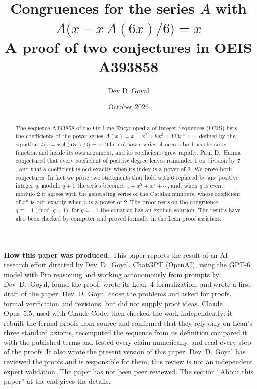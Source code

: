 \documentclass[11pt,a4paper]{article}
\title{Congruences for the series $A$ with $A\bigl(x-x\,A(6x)/6\bigr)=x$\\[6pt]\large A proof of two conjectures in OEIS A393858}
\author{Dev D. Goyal}
\date{October 2026}
\theoremstyle{definition}
\theoremstyle{remark}
\begin{document}
\maketitle
\begin{abstract}
The sequence A393858 of the On-Line Encyclopedia of Integer Sequences (OEIS) lists the coefficients of the power
series $A(x)=x+x^2+8x^3+323x^4+\cdots$ defined by the equation
$A\bigl(x-x\,A(6x)/6\bigr)=x$. The unknown series $A$ occurs both as the outer function and inside its own argument, and its coefficients grow rapidly.
Paul~D.~Hanna conjectured that every coefficient of positive degree leaves remainder $1$ on division by $7$, and that a coefficient is odd exactly when its index is a power of $2$. We prove both conjectures. In fact we prove two statements that hold with $6$ replaced by any positive integer $q$: modulo $q+1$ the series becomes $x+x^2+x^3+\cdots$, and, when $q$ is even, modulo $2$ it agrees with the generating series of the Catalan numbers, whose coefficient of $x^n$ is odd exactly when $n$ is a power of $2$. The proof rests on the congruence $q\equiv-1\pmod{q+1}$: for $q=-1$ the equation
has an explicit solution. The results have also been checked by computer and proved formally in the
Lean proof assistant.
\end{abstract}
\begin{center}\begin{minipage}{0.88\linewidth}\small
\textbf{How this paper was produced.} This paper reports the result of an AI research effort directed by
Dev~D.~Goyal. ChatGPT (OpenAI), using the GPT-6 model with Pro reasoning and working autonomously from prompts by
Dev~D.~Goyal, found the proof, wrote its Lean~4 formalization, and wrote a first draft of the paper.
Dev~D.~Goyal chose the problems and asked for proofs, formal verification and revisions, but did not supply proof
ideas. Claude Opus~5.5, used with Claude Code, then checked the work independently: it rebuilt the formal proofs from
source and confirmed that they rely only on Lean's three standard axioms, recomputed the sequence from its definition
compared it with the published terms and tested every claim numerically, and read every step of the proofs. It also wrote the present
version of this paper.
Dev~D.~Goyal has reviewed the proofs and is responsible for them; this review is not an independent expert validation.
The paper has not been peer reviewed.
The section ``About this paper'' at the end gives the details.
\end{minipage}\end{center}
\end{document}
